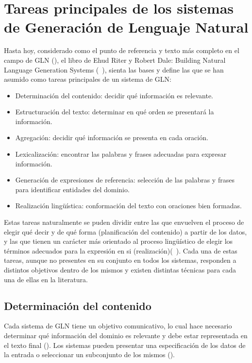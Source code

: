 \section{Tareas principales de los sistemas de Generación de Lenguaje Natural}

    Hasta hoy, considerado como el punto de referencia y texto más completo en el campo de GLN (\cite{Gatt2018SurveyOT}), el libro de Ehud Riter y
Robert Dale: Building Natural Language Generation Systems (~\cite{reiter_dale_2000}), sienta las bases y define las que se han asumido como tareas principales 
de un sistema de GLN:

\begin{itemize}
    \item Determinación del contenido: decidir qué información es relevante.
    \item Estructuración del texto: determinar en qué orden se presentará la información.
    \item Agregación: decidir qué información se presenta en cada oración.
    \item Lexicalización: encontrar las palabras y frases adecuadas para expresar información.
    \item Generación de expresiones de referencia: selección de las palabras y frases para identificar entidades del dominio.
    \item Realización lingüística: conformación del texto con oraciones bien formadas.
\end{itemize}


Estas tareas naturalmente se puden dividir entre las que envuelven el proceso de elegir qué decir y de qué forma (planificación del contenido) 
a partir de los datos, y las que tienen un carácter más orientado al proceso lingüístico de elegir los términos adecuados para la expresión 
en si (realización)(~\cite{Gatt2018SurveyOT}). Cada una de estas tareas, aunque no presentes en su conjunto en todos los sistemas,  responden a distintos 
objetivos dentro de los mismos y existen distintas técnicas para cada una de ellas en la literatura.
    
\subsection{Determinación del contenido}\label{subsection:selecciondelcontenido}

    Cada sistema de GLN tiene un objetivo comunicativo, lo cual hace necesario determinar qué información del dominio es relevante y debe 
estar representada en el texto final (\cite{reiter_dale_2000}). Los sistemas pueden presentar una especificación de los datos de la entrada 
o seleccionar un subconjunto de los mismos (\cite{reiter_dale_2000}).

